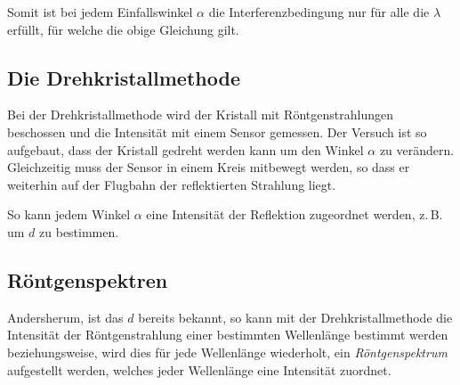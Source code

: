 \documentclass{article}
\begin{document}
Somit ist bei jedem Einfallswinkel $\alpha$ die Interferenzbedingung nur für alle die $\lambda$ erfüllt, für welche die obige Gleichung gilt. 
 
\subsection{Die Drehkristallmethode}
Bei der Drehkristallmethode wird der Kristall mit Röntgenstrahlungen beschossen und die Intensität mit einem Sensor gemessen. Der Versuch ist so aufgebaut, dass der Kristall gedreht werden kann um den Winkel $\alpha$ zu verändern. Gleichzeitig muss der Sensor in einem Kreis mitbewegt werden, so dass er weiterhin auf der Flugbahn der reflektierten Strahlung liegt.
 
So kann jedem Winkel $\alpha$ eine Intensität der Reflektion zugeordnet werden, z.\,B. um $d$ zu bestimmen.
 
\subsection{Röntgenspektren} 
Andersherum, ist das $d$ bereits bekannt, so kann mit der Drehkristallmethode die Intensität der Röntgenstrahlung einer bestimmten Wellenlänge bestimmt werden beziehungsweise, wird dies für jede Wellenlänge wiederholt, ein \emph{Röntgenspektrum} aufgestellt werden, welches jeder Wellenlänge eine Intensität zuordnet.
\end{document}
